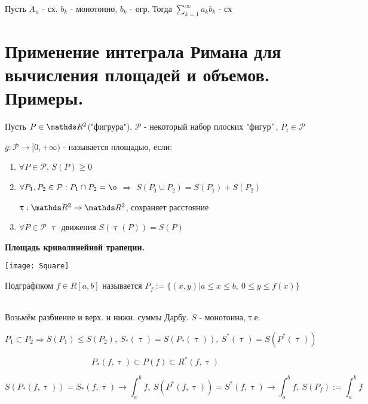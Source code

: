 \documentclass[12pt, fleqn]{article}
\begin{document}
\begin{Property}[3]
\begin{Property}[4]
\begin{Property}[2, аддитивность]
\begin{Proof}
\begin{theorem} 
    Пусть $A_n$ - сх. $b_k$ - монотонно, $b_k$ - огр. Тогда $\sum\limits_{k=1}^\infty a_k b_k$ - сх
\end{theorem}

\newpage
\section{Применение интеграла Римана для вычисления площадей и объемов. Примеры.}

\begin{definition} [школьное]
    Пусть $P \in \R^2$("фигрура"), $\mathcal{P}$ - некоторый набор плоских "фигур$"$, $P_i \in \mathcal{P}$
    
    $g: \mathcal{P} \rightarrow [0, +\infty)$ - называется площадью, если: 
    \begin{enumerate}
        \item $\forall P \in \mathcal{P}$, $S(P) \geqslant 0$
        \item $\forall P_1, P_2 \in \mathcal{P}: P_1 \cap P_2 = \o$ $\Rightarrow$ $S(P_1 \cup P_2)=S(P_1)+S(P_2)$
        \begin{definition}
            $\uptau: \R^2 \rightarrow \R^2$, сохраняет расстояние
        \end{definition}
        \item $\forall P \in \mathcal{P}$ $\uptau$-движения $S(\uptau(P))=S(P)$
    \end{enumerate}
\end{definition}

\begin{center}
    \textbf{Площадь криволинейной трапеции.}
\end{center}

\texttt{[image: Square]}

\begin{definition}
    Подграфиком $f \in R[a,b]$ называется $P_f := \{(x,y)| a \leqslant x \leqslant b,\ 0 \leqslant y \leqslant f(x) \}$
\end{definition}
\\
Возьмём разбиение и верх. и нижн. суммы Дарбу. $S$ - монотонна, т.е. 

$$P_1 \subset P_2 \Rightarrow S(P_1) \leqslant S(P_2),\ S_*(\uptau)=S(P_*(\uptau)),\ S^*(\uptau)=S(P^*(\uptau))$$ 

$$P_*(f, \uptau) \subset P (f) \subset R^* (f, \uptau)$$

$$S(P_*(f, \uptau)) = S_*(f, \uptau) \rightarrow \int_a^b f,\ S(P^*(f, \uptau)) = S^*(f, \uptau) \rightarrow \int_a^b f,\ S(P_f) := \int_a^b f$$


\end{Proof}
\end{Property}
\end{Property}
\end{Property}
\end{document}
